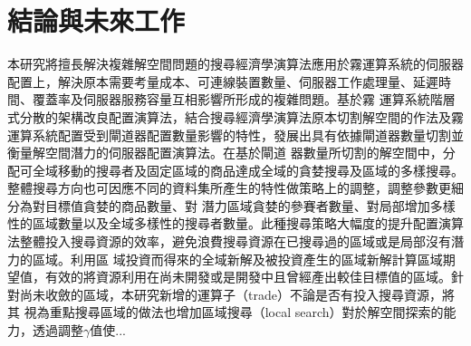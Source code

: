 \chapter{結論與未來工作}
\label{chapter:conclusion}
本研究將擅長解決複雜解空間問題的搜尋經濟學演算法應用於霧運算系統的伺服器配置上，解決原本需要考量成本、可連線裝置數量、伺服器工作處理量、延遲時間、覆蓋率及伺服器服務容量互相影響所形成的複雜問題。基於霧
運算系統階層式分散的架構改良配置演算法，結合搜尋經濟學演算法原本切割解空間的作法及霧運算系統配置受到閘道器配置數量影響的特性，發展出具有依據閘道器數量切割並衡量解空間潛力的伺服器配置演算法。在基於閘道
器數量所切割的解空間中，分配可全域移動的搜尋者及固定區域的商品達成全域的貪婪搜尋及區域的多樣搜尋。整體搜尋方向也可因應不同的資料集所產生的特性做策略上的調整，調整參數更細分為對目標值貪婪的商品數量、對
潛力區域貪婪的參賽者數量、對局部增加多樣性的區域數量以及全域多樣性的搜尋者數量。此種搜尋策略大幅度的提升配置演算法整體投入搜尋資源的效率，避免浪費搜尋資源在已搜尋過的區域或是局部沒有潛力的區域。利用區
域投資而得來的全域新解及被投資產生的區域新解計算區域期望值，有效的將資源利用在尚未開發或是開發中且曾經產出較佳目標值的區域。針對尚未收斂的區域，本研究新增的運算子（trade）不論是否有投入搜尋資源，將其
視為重點搜尋區域的做法也增加區域搜尋（local search）對於解空間探索的能力，透過調整$\gamma$值使...